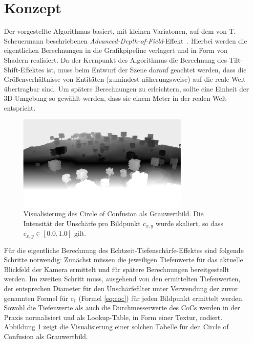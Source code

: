 \documentclass{acmsiggraph}                     %
\begin{document}
\section{Konzept}

Der vorgestellte Algorithmus basiert, mit kleinen Variatonen, auf dem von T. Scheuermann beschriebenen \emph{Advanced-Depth-of-Field}-Effekt~\cite{Scheuermann:2004wd}. Hierbei werden die eigentlichen Berechnungen in die Grafikpipeline verlagert und in Form von Shadern realisiert. Da der Kernpunkt des Algorithmus die Berechnung des Tilt-Shift-Effektes ist, muss beim Entwurf der Szene darauf geachtet werden, dass die Größenverhältnisse von Entitäten (zumindest näherungsweise) auf die reale Welt übertragbar sind. Um spätere Berechnungen zu erleichtern, sollte eine Einheit der 3D-Umgebung so gewählt werden, dass sie einem Meter in der realen Welt entspricht.

\begin{figure}[htbp]
\centering
\includegraphics[width=3.35in]{Blockcraft-1-CoC}
\caption{Visualisierung des Circle of Confusion als Grauwertbild. Die Intensität der Unschärfe pro Bildpunkt $c_{x,y}$ wurde skaliert, so dass $c_{x,y} \in [0.0,1.0]$ gilt.}
\label{fig:cocmap}
\end{figure}

Für die eigentliche Berechnung des Echtzeit-Tiefenschärfe-Effektes sind folgende Schritte notwendig: Zunächst müssen die jeweiligen Tiefenwerte für das aktuelle Blickfeld der Kamera ermittelt und für spätere Berechnungen bereitgestellt werden. Im zweiten Schritt muss, ausgehend von den ermittelten Tiefenwerten, der entsprechen Diameter für den Unschärfefilter unter Verwendung der zuvor genannten Formel für $c_1$ (Formel \ref{eq:coc}) für jeden Bildpunkt ermittelt werden. Sowohl die Tiefenwerte als auch die Durchmesserwerte des CoCs werden in der Praxis normalisiert und als Lookup-Table, in Form einer Textur, codiert. Abbildung \ref{fig:cocmap} zeigt die Visualisierung einer solchen Tabelle für den Circle of Confusion als Grauwertbild. 
\end{document}
